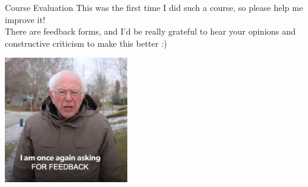 \documentclass{beamer}
\begin{document}
\begin{frame}{Course Evaluation}
  This was the first time I did such a course, so please help me improve it!\\
  There are feedback forms, and I'd be really grateful to hear your opinions and constructive criticism to make this better :)

  \begin{center}
    \includegraphics[width=0.4\textwidth]{images/feedback.png}
  \end{center}
\end{frame}
\end{document}
